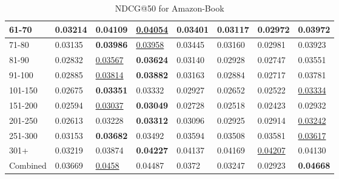 \begin{table}[]
\begin{tabular}{|l|l|l|l|l|l|l||l|}
        61-70       & 0.03214                        & \textbf{0.04109}               & \underline{0.04054}            & 0.03401                        & 0.03117                        & 0.02972                        & 0.03972                    \\ \hline
        71-80       & 0.03135                        & \textbf{0.03986}               & \underline{0.03958}            & 0.03445                        & 0.03160                        & 0.02981                        & 0.03923                    \\ \hline
        81-90       & 0.02832                        & \underline{0.03567}            & \textbf{0.03624}               & 0.03140                        & 0.02928                        & 0.02747                        & 0.03551                    \\ \hline
        91-100      & 0.02885                        & \underline{0.03814}            & \textbf{0.03882}               & 0.03163                        & 0.02884                        & 0.02717                        & 0.03781                    \\ \hline
        101-150     & 0.02675                        & \textbf{0.03351}               & 0.03332                        & 0.02927                        & 0.02652                        & 0.02522                        & \underline{0.03334}        \\ \hline
        151-200     & 0.02594                        & \underline{0.03037}            & \textbf{0.03049}               & 0.02728                        & 0.02518                        & 0.02423                        & 0.02932                    \\ \hline
        201-250     & 0.02613                        & 0.03228                        & \textbf{0.03312}               & 0.03096                        & 0.02925                        & 0.02914                        & \underline{0.03242}        \\ \hline
        251-300     & 0.03153                        & \textbf{0.03682}               & 0.03492                        & 0.03594                        & 0.03508                        & 0.03581                        & \underline{0.03617}        \\ \hline
        301+        & 0.03219                        & 0.03874                        & \textbf{0.04227}               & 0.04137                        & 0.04169                        & \underline{0.04207}            & 0.04130                    \\ \hline
        Combined    & 0.03669                        & \underline{0.0458}             & 0.04487                        & 0.0372                         & 0.03247                        & 0.02923                        & \textbf{0.04668}           \\ \hline
    \end{tabular}
    \caption{NDCG@50 for Amazon-Book}
    \label{tab:amazon-book-NDCG-evaluation}
\end{table}
